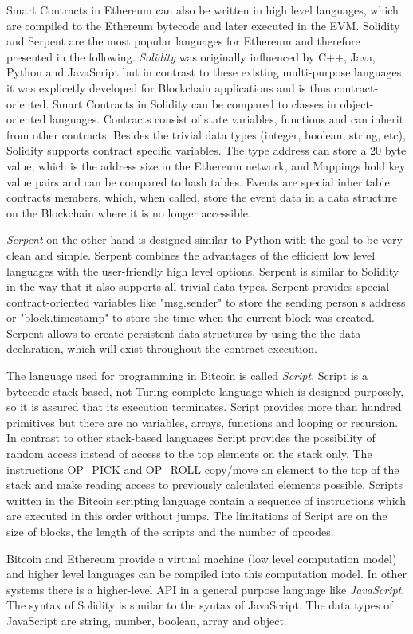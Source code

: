 \documentclass[conference]{IEEEtran}
\begin{document}
Smart Contracts in Ethereum can also be written in high level languages, which are compiled to the Ethereum bytecode and later executed in the EVM. Solidity and Serpent are the most popular languages for Ethereum and therefore presented in the following. \textit{Solidity} was originally influenced by C++, Java, Python and JavaScript but in contrast to these existing multi-purpose languages, it was explicetly developed for Blockchain applications and is thus contract-oriented. Smart Contracts in Solidity can be compared to classes in object-oriented languages. Contracts consist of state variables, functions and can inherit from other contracts. Besides the trivial data types (integer, boolean, string, etc), Solidity supports contract specific variables. The type address can store a 20 byte value, which is the address size in the Ethereum network, and Mappings hold key value pairs and can be compared to hash tables. Events are special inheritable contracts members, which, when called, store the event data in a data structure on the Blockchain where it is no longer accessible. \cite{Solidity2017} \cite{McAdams2017} \par 
\textit{Serpent} on the other hand is designed similar to Python with the goal to be very clean and simple. Serpent combines the advantages of the efficient low level languages with the user-friendly high level options. Serpent is similar to Solidity in the way that it also supports all trivial data types. Serpent provides special contract-oriented variables like "msg.sender" to store the sending person's address or "block.timestamp" to store the time when the current block was created. Serpent allows to create persistent data structures by using the the data declaration, which will exist throughout the contract execution. \cite{McAdams2017} \cite{Arnett2015} \par 
The language used for programming in Bitcoin is called \textit{Script}. Script is a bytecode stack-based, not Turing complete language which is designed purposely, so it is assured that its execution terminates. Script provides more than hundred primitives but there are no variables, arrays, functions and looping or recursion. In contrast to other stack-based languages Script provides the possibility of random access instead of access to the top elements on the stack only. The instructions OP\_PICK and OP\_ROLL copy/move an element to the top of the stack and make reading access to previously calculated elements possible. Scripts written in the Bitcoin scripting language contain a sequence of instructions which are executed in this order without jumps. The limitations of Script are on the size of blocks, the length of the scripts and the number of opcodes. \cite{McAdams2017} \par 
Bitcoin and Ethereum provide a virtual machine (low level computation model) and higher level languages can be compiled into this computation model. In other systems there is a higher-level API in a general purpose language like \textit{JavaScript}. The syntax of Solidity is similar to the syntax of JavaScript. \cite{McAdams2017} The data types of JavaScript are string, number, boolean, array and object. \cite{McPeak2015} \par 
\end{document}
